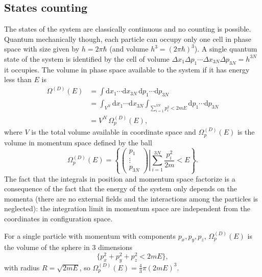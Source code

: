 \documentclass[12pt]{article}
\numberwithin{equation}{section} %
\begin{document}
\subsection{States counting}
The states of the system are classically continuous and no counting is possible. Quantum mechanically though, each particle can occupy only one cell in phase space with size given by $h = 2\pi\hbar$ (and volume $h^3=(2\pi\hbar)^3$). A single quantum state of the system is identified by the cell of volume $\Delta x_1 \Delta p_1 \cdots \Delta x_{3N} \Delta p_{3N} = h^{3N}$ it occupies. The volume in phase space available to the system if it has energy less than $E$ is
\begin{equation}
\begin{aligned}
\Omega^{(D)}(E) &= \int \text{d}x_1\cdots\mathrm{d}x_{3N}\,\mathrm{d}p_1\cdots\text{d}p_{3N}\\
&= \int_{V^N} \mathrm{d}x_1\cdots\mathrm{d}x_{3N}\int_{\sum_{i=1}^{3N} p_i^2 < 2 m E} \mathrm{d}p_1\cdots\mathrm{d}p_{3N}\\
&= V^N\,\Omega^{(D)}_p (E),
\end{aligned}
\end{equation}
where $V$ is the total volume available in coordinate space and $\Omega^{(D)}_p (E)$ is the volume in momentum space defined by the ball
\begin{equation}
\Omega^{(D)}_p (E) = \left\lbrace \left(
\begin{array}{c}
p_1\\
\vdots\\
p_{3N}
\end{array}
\right) \left| \sum_{i=1}^{3N} \frac {p_i^2}{2 m} < E \right.\right\rbrace.
\end{equation}
The fact that the integrals in position and momentum space factorize is a consequence of the fact that the energy of the system only depends on the momenta (there are no external fields and the interactions among the particles is neglected): the integration limit in momentum space are independent from the coordinates in configuration space.

For a single particle with momentum with components $p_x, p_y, p_z$, $\Omega^{(D)}_p (E)$ is the volume of the sphere in $3$ dimensions
\begin{equation}
\biggl\lbrace p_x^2 + p_y^2 + p_z^2 < 2 m E\biggr\rbrace,
\end{equation}
with radius $R = \sqrt{2mE}$, so $\Omega^{(D)}_p (E) = \frac{4}{3}\pi (2mE)^3$.
\end{document}
